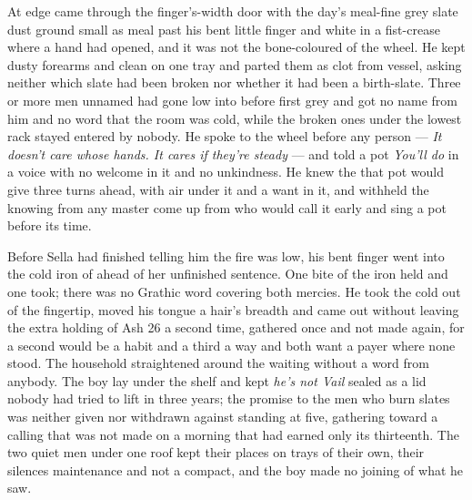 At  edge  came through the finger's-width door with the day's meal-fine grey slate dust ground small as meal past his bent little finger and white in a fist-crease where a hand had opened, and it was not the bone-coloured  of the wheel. He kept dusty forearms and clean on one tray and parted them as clot from vessel, asking neither which slate had been broken nor whether it had been a birth-slate. Three or more men unnamed had gone low into  before first grey and got no name from him and no word that the room was cold, while the broken ones under the lowest rack stayed entered by nobody. He spoke to the wheel before any person --- \emph{It doesn't care whose hands. It cares if they're steady} --- and told a pot \emph{You'll do} in a voice with no welcome in it and no unkindness. He knew the  that pot would give three turns ahead, with air under it and a want in it, and withheld the knowing from any master come up from  who would call it early and sing a pot before its time.

Before Sella had finished telling him the fire was low, his bent finger went into the cold iron of  ahead of her unfinished sentence. One bite of the iron held and one took; there was no Grathic word covering both mercies. He took the cold out of the fingertip, moved his tongue a hair's breadth and came out without leaving the extra holding of Ash 26 a second time, gathered once and not made again, for a second would be a habit and a third a way and both want a payer where none stood. The household straightened around the waiting without a word from anybody. The boy lay under the shelf and kept \emph{he's not Vail} sealed as a lid nobody had tried to lift in three years; the promise to the men who burn slates was neither given nor withdrawn against  standing at five, gathering toward a calling that was not made on a morning that had earned only its thirteenth. The two quiet men under one roof kept their places on trays of their own, their silences maintenance and not a compact, and the boy made no joining of what he saw.

\scenebreak


